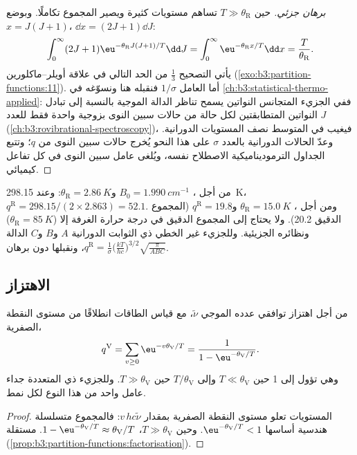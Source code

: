 \begin{proof}[برهان جزئي]
حين $T \gg \theta_{\mathrm R}$ تساهم مستويات كثيرة ويصير المجموع تكاملًا.
وبوضع $x = J(J+1)$، $\dd x = (2J+1)\dd J$:
\[
  \int_0^\infty(2J+1)\eu^{-\theta_{\mathrm R}J(J+1)/T}\dd J = \int_0^\infty\eu^{-\theta_{\mathrm R}x/T}\dd x
  = \frac{T}{\theta_{\mathrm R}}.
\]
يأتي التصحيح $\frac13$ من الحد التالي في علاقة أويلر--ماكلورين
(\cref{exo:b3:partition-functions:11}). أما العامل $1/\sigma$ فنقبله هنا 
ونسوّغه في \cref{ch:b3:statistical-thermo-applied}: ففي الجزيء المتجانس النواتين
يسمح تناظر الدالة الموجية بالنسبة إلى تبادل النواتين المتطابقتين
لكل حالة من حالات سبين النوى بزوجية واحدة فقط للعدد $J$
(\cref{ch:b3:rovibrational-spectroscopy})، فيغيب في المتوسط نصف المستويات
الدورانية. وعدّ الحالات الدورانية بالعدد $\sigma$ على هذا النحو
يُخرج حالات سبين النوى من $q$؛ وتتبع الجداول الترموديناميكية
الاصطلاح نفسه، ويُلغى عامل سبين النوى في كل تفاعل
كيميائي.
\end{proof}

من أجل ، $B_0 = \qty{1.990}{cm^{-1}}$ و$\theta_{\mathrm R} = \qty{2.86}{K}$: وعند \qty{298.15}{K}،
$q^{\mathrm R} = 298.15/(2\times2.863) = 52.1$. ومن أجل ، $\theta_{\mathrm R} = \qty{15.0}{K}$ 
و$q^{\mathrm R} = 19.8$ (المجموع الدقيق 20.2). ولا يحتاج إلى المجموع الدقيق في درجة حرارة الغرفة إلا  ($\theta_{\mathrm R} = \qty{85}{K}$)
ونظائره الجزيئية. وللجزيء غير الخطي ذي الثوابت الدورانية
$A$ و$B$ و$C$ الدالة $q^{\mathrm R} = \frac{1}{\sigma}\bigl(\frac{kT}{hc}\bigr)^{3/2}\sqrt{\frac{\pi}{ABC}}$، ونقبلها دون برهان.

\subsection*{الاهتزاز}

\begin{proposition}\label{prop:b3:partition-functions:q-vib}
من أجل اهتزاز توافقي عدده الموجي $\tilde\nu$، مع قياس الطاقات انطلاقًا من
مستوى النقطة الصفرية،
\[
  q^{\mathrm V} = \sum_{v\ge0}\eu^{-v\theta_{\mathrm V}/T} = \frac{1}{1 - \eu^{-\theta_{\mathrm V}/T}} .
\]
وهي تؤول إلى 1 حين $T \ll \theta_{\mathrm V}$ وإلى $T/\theta_{\mathrm V}$ حين $T \gg \theta_{\mathrm V}$. وللجزيء
ذي  المتعددة جداء عامل واحد من هذا النوع لكل نمط.
\end{proposition}

\begin{proof}
المستويات تعلو مستوى النقطة الصفرية بمقدار $v\,hc\tilde\nu$: فالمجموع متسلسلة هندسية
أساسها $\eu^{-\theta_{\mathrm V}/T} < 1$. وحين $T \gg \theta_{\mathrm V}$، $1 - \eu^{-\theta_{\mathrm V}/T} \approx \theta_{\mathrm V}/T$.
 مستقلة (\cref{prop:b3:partition-functions:factorisation}).
\end{proof}

